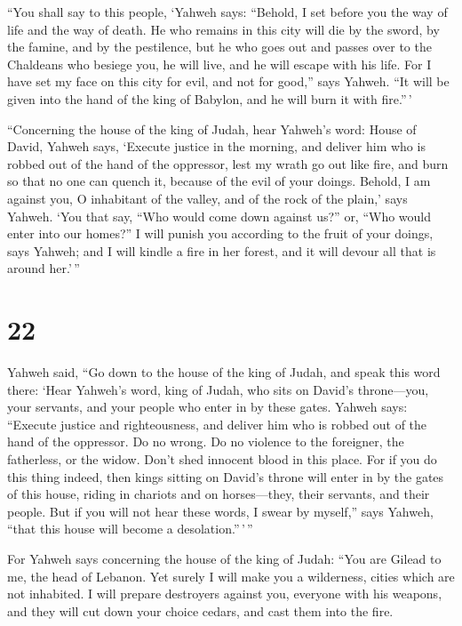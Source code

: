  ``You shall say to this people, `Yahweh says: ``Behold, I
set before you the way of life and the way of death.  He who
remains in this city will die by the sword, by the famine, and by the
pestilence, but he who goes out and passes over to the Chaldeans who
besiege you, he will live, and he will escape with his life.
 For I have set my face on this city for evil, and not for
good,'' says Yahweh. ``It will be given into the hand of the king of
Babylon, and he will burn it with fire.''\,'

 ``Concerning the house of the king of Judah, hear Yahweh's
word:  House of David, Yahweh says, `Execute justice in the
morning, and deliver him who is robbed out of the hand of the oppressor,
lest my wrath go out like fire, and burn so that no one can quench it,
because of the evil of your doings.  Behold, I am against
you, O inhabitant of the valley, and of the rock of the plain,' says
Yahweh. `You that say, ``Who would come down against us?'' or, ``Who
would enter into our homes?''  I will punish you according
to the fruit of your doings, says Yahweh; and I will kindle a fire in
her forest, and it will devour all that is around her.'\,''

\hypertarget{section-21}{%
\section{22}\label{section-21}}

 Yahweh said, ``Go down to the house of the king of Judah,
and speak this word there:  `Hear Yahweh's word, king of
Judah, who sits on David's throne---you, your servants, and your people
who enter in by these gates.  Yahweh says: ``Execute justice
and righteousness, and deliver him who is robbed out of the hand of the
oppressor. Do no wrong. Do no violence to the foreigner, the fatherless,
or the widow. Don't shed innocent blood in this place.  For
if you do this thing indeed, then kings sitting on David's throne will
enter in by the gates of this house, riding in chariots and on
horses---they, their servants, and their people.  But if you
will not hear these words, I swear by myself,'' says Yahweh, ``that this
house will become a desolation.''\,'\,''

 For Yahweh says concerning the house of the king of Judah:
``You are Gilead to me, the head of Lebanon. Yet surely I will make you
a wilderness, cities which are not inhabited.  I will
prepare destroyers against you, everyone with his weapons, and they will
cut down your choice cedars, and cast them into the fire.

